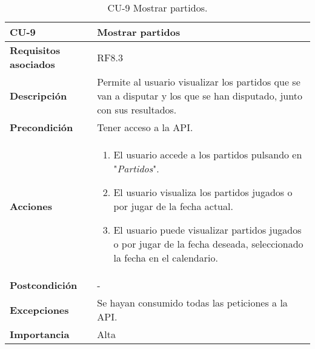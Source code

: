 \begin{table}[p]
	\centering
	\begin{tabularx}{\linewidth}{ p{} p{} }
		\toprule
		\textbf{CU-9}    & \textbf{Mostrar partidos}\\
		\toprule
		\textbf{Requisitos asociados} & RF8.3 \\
		\textbf{Descripción}          & Permite al usuario visualizar los partidos que se van a disputar y los que se han disputado, junto con sus resultados. \\
		\textbf{Precondición}         & Tener acceso a la API. \\
		\textbf{Acciones}             &
		\begin{enumerate}
			\def\labelenumi{\arabic{enumi}.}
			\tightlist
			\item El usuario accede a los partidos pulsando en "\textit{Partidos}".
                \item El usuario visualiza los partidos jugados o por jugar de la fecha actual.
                \item El usuario puede visualizar partidos jugados o por jugar de la fecha deseada, seleccionado la fecha en el calendario.
		\end{enumerate}\\
		\textbf{Postcondición}        &  - \\
		\textbf{Excepciones}          &  Se hayan consumido todas las peticiones a la API. \\
		\textbf{Importancia}          &  Alta \\
		\bottomrule
	\end{tabularx}
	\caption{CU-9 Mostrar partidos.}
\end{table}

